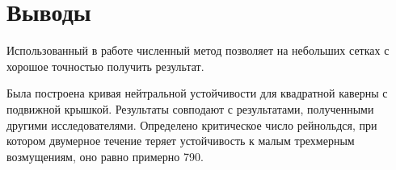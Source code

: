 \section*{Выводы}

Использованный в работе численный метод позволяет на небольших сетках с хорошое точностью получить результат. 

Была построена кривая нейтральной устойчивости для квадратной каверны с подвижной крышкой. Результаты совподают с результатами, полученными другими исследователями. Определено критическое число рейнольдся, при котором двумерное течение теряет устойчивость к малым трехмерным возмущениям, оно равно примерно 790. 
